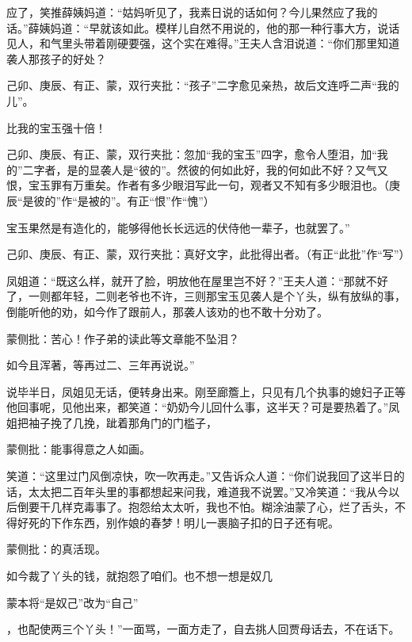 \begin{parag}
应了，笑推薛姨妈道：“姑妈听见了，我素日说的话如何？今儿果然应了我的话。”薛姨妈道：“早就该如此。模样儿自然不用说的，他的那一种行事大方，说话见人，和气里头带着刚硬要强，这个实在难得。”王夫人含泪说道：“你们那里知道袭人那孩子的好处？\begin{note}己卯、庚辰、有正、蒙，双行夹批：“孩子”二字愈见亲热，故后文连呼二声“我的儿”。\end{note}比我的宝玉强十倍！\begin{note}己卯、庚辰、有正、蒙，双行夹批：忽加“我的宝玉”四字，愈令人堕泪，加“我的”二字者，是的显袭人是“彼的”。然彼的何如此好，我的何如此不好？又气又恨，宝玉罪有万重矣。作者有多少眼泪写此一句，观者又不知有多少眼泪也。（庚辰“是彼的”作“是被的”。有正“恨”作“愧”）\end{note}宝玉果然是有造化的，能够得他长长远远的伏侍他一辈子，也就罢了。”\begin{note}己卯、庚辰、有正、蒙，双行夹批：真好文字，此批得出者。（有正“此批”作“写”）\end{note}凤姐道：“既这么样，就开了脸，明放他在屋里岂不好？”王夫人道：“那就不好了，一则都年轻，二则老爷也不许，三则那宝玉见袭人是个丫头，纵有放纵的事，倒能听他的劝，如今作了跟前人，那袭人该劝的也不敢十分劝了。\begin{note}蒙侧批：苦心！作子弟的读此等文章能不坠泪？\end{note}如今且浑著，等再过二、三年再说说。”
\end{parag}


\begin{parag}
    说毕半日，凤姐见无话，便转身出来。刚至廊簷上，只见有几个执事的媳妇子正等他回事呢，见他出来，都笑道：“奶奶今儿回什么事，这半天？可是要热着了。”凤姐把袖子挽了几挽，跐着那角门的门槛子，\begin{note}蒙侧批：能事得意之人如画。\end{note}笑道：“这里过门风倒凉快，吹一吹再走。”又告诉众人道：“你们说我回了这半日的话，太太把二百年头里的事都想起来问我，难道我不说罢。”又冷笑道：“我从今以后倒要干几样克毒事了。抱怨给太太听，我也不怕。糊涂油蒙了心，烂了舌头，不得好死的下作东西，别作娘的春梦！明儿一裹脑子扣的日子还有呢。\begin{note}蒙侧批：的真活现。\end{note}如今裁了丫头的钱，就抱怨了咱们。也不想一想是奴几\begin{note}蒙本将“是奴己”改为“自己”\end{note}，也配使两三个丫头！”一面骂，一面方走了，自去挑人回贾母话去，不在话下。
\end{parag}


